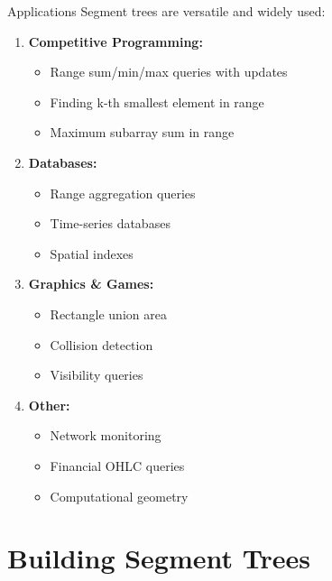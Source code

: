 \documentclass[aspectratio=169]{beamer}
\begin{document}
\begin{frame}{Applications}
  Segment trees are versatile and widely used:

  \vspace{0.3cm}
  \begin{enumerate}
    \item \textbf{Competitive Programming:}
      \begin{itemize}
        \item Range sum/min/max queries with updates
        \item Finding k-th smallest element in range
        \item Maximum subarray sum in range
      \end{itemize}
    \item \textbf{Databases:}
      \begin{itemize}
        \item Range aggregation queries
        \item Time-series databases
        \item Spatial indexes
      \end{itemize}
    \item \textbf{Graphics \& Games:}
      \begin{itemize}
        \item Rectangle union area
        \item Collision detection
        \item Visibility queries
      \end{itemize}
    \item \textbf{Other:}
      \begin{itemize}
        \item Network monitoring
        \item Financial OHLC queries
        \item Computational geometry
      \end{itemize}
  \end{enumerate}
\end{frame}

\section{Building Segment Trees}
\end{document}
